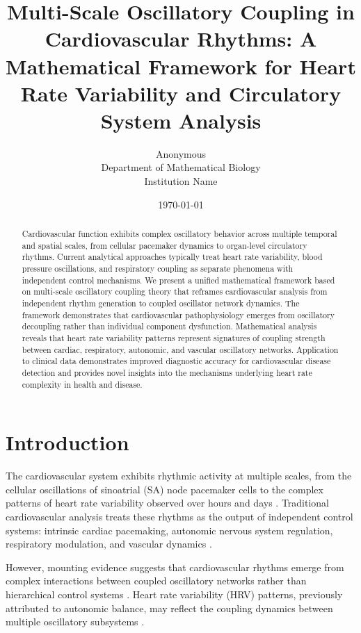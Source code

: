 \documentclass[twocolumn]{article}
\title{Multi-Scale Oscillatory Coupling in Cardiovascular Rhythms: A Mathematical Framework for Heart Rate Variability and Circulatory System Analysis}
\author{
Anonymous\\
Department of Mathematical Biology\\
Institution Name
}
\date{\today}
\begin{document}
\maketitle

\begin{abstract}
Cardiovascular function exhibits complex oscillatory behavior across multiple temporal and spatial scales, from cellular pacemaker dynamics to organ-level circulatory rhythms. Current analytical approaches typically treat heart rate variability, blood pressure oscillations, and respiratory coupling as separate phenomena with independent control mechanisms. We present a unified mathematical framework based on multi-scale oscillatory coupling theory that reframes cardiovascular analysis from independent rhythm generation to coupled oscillator network dynamics. The framework demonstrates that cardiovascular pathophysiology emerges from oscillatory decoupling rather than individual component dysfunction. Mathematical analysis reveals that heart rate variability patterns represent signatures of coupling strength between cardiac, respiratory, autonomic, and vascular oscillatory networks. Application to clinical data demonstrates improved diagnostic accuracy for cardiovascular disease detection and provides novel insights into the mechanisms underlying heart rate complexity in health and disease.
\end{abstract}

\section{Introduction}

The cardiovascular system exhibits rhythmic activity at multiple scales, from the cellular oscillations of sinoatrial (SA) node pacemaker cells to the complex patterns of heart rate variability observed over hours and days \citep{task1996heart,goldberger2000physiobank}. Traditional cardiovascular analysis treats these rhythms as the output of independent control systems: intrinsic cardiac pacemaking, autonomic nervous system regulation, respiratory modulation, and vascular dynamics \citep{levy2013cardiovascular}.

However, mounting evidence suggests that cardiovascular rhythms emerge from complex interactions between coupled oscillatory networks rather than hierarchical control systems \citep{glass2001synchronization,ivanov2009focus}. Heart rate variability (HRV) patterns, previously attributed to autonomic balance, may reflect the coupling dynamics between multiple oscillatory subsystems \citep{porta2001assessment}.
\end{document}
